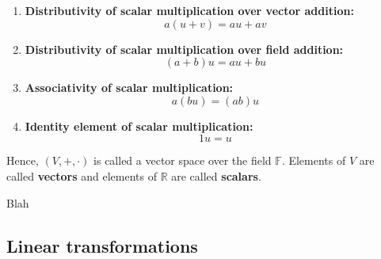 \begin{definition}
\begin{enumerate}
		\item \textbf{Distributivity of scalar multiplication over vector addition:}
		      \begin{equation}
			      a(u+v)=au+av
			      \label{eq:r-vector-space-7}
		      \end{equation}

		\item \textbf{Distributivity of scalar multiplication over field addition:}
		      \begin{equation}
			      (a+b)u=au+bu
			      \label{eq:r-vector-space-8}
		      \end{equation}

		\item \textbf{Associativity of scalar multiplication:}
		      \begin{equation}
			      a(bu)=(ab)u
			      \label{eq:r-vector-space-9}
		      \end{equation}

		\item \textbf{Identity element of scalar multiplication:}
		      \begin{equation}
			      1u=u
			      \label{eq:r-vector-space-10}
		      \end{equation}

	\end{enumerate}

	Hence, $(V,+,\cdot)$ is called a vector space over the field $\mathbb{F}$. Elements of \( V \) are called \textbf{vectors} and elements of \( \mathbb{R} \) are called \textbf{scalars}.
\end{definition}

\begin{example}

\end{example}

\begin{theorem}
	Blah
\end{theorem}

\subsection{Linear transformations}
